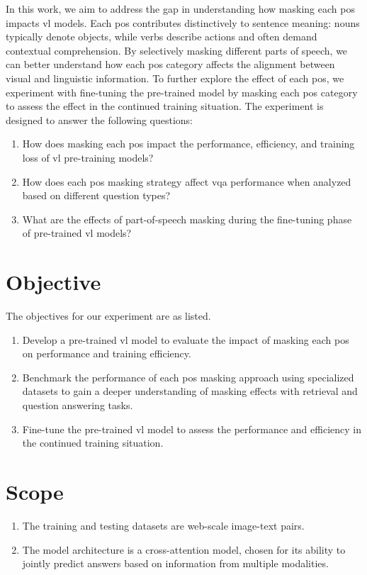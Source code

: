 In this work, we aim to address the gap in understanding how masking each \acrfull{pos} impacts \acrshort{vl} models.  
Each \acrshort{pos} contributes distinctively to sentence meaning: nouns typically denote objects, while verbs describe actions and often demand contextual comprehension.  
By selectively masking different parts of speech, we can better understand how each \acrshort{pos} category affects the alignment between visual and linguistic information.  
To further explore the effect of each \acrshort{pos}, we experiment with fine-tuning the pre-trained model by masking each \acrshort{pos} category to assess the effect in the continued training situation.  
The experiment is designed to answer the following questions:  
\begin{enumerate}  
    \item How does masking each \acrshort{pos} impact the performance, efficiency, and training loss of \acrshort{vl} pre-training models?  
    \item How does each \acrshort{pos} masking strategy affect \acrfull{vqa} performance when analyzed based on different question types?  
    \item What are the effects of part-of-speech masking during the fine-tuning phase of pre-trained \acrshort{vl} models?  
\end{enumerate}  


\section{Objective}  
The objectives for our experiment are as listed.  
\begin{enumerate}  
    \item Develop a pre-trained \acrshort{vl} model to evaluate the impact of masking each \acrshort{pos} on performance and training efficiency.  
    \item Benchmark the performance of each \acrshort{pos} masking approach using specialized datasets to gain a deeper understanding of masking effects with retrieval and question answering tasks.  
    \item Fine-tune the pre-trained \acrshort{vl} model to assess the performance and efficiency in the continued training situation.  
\end{enumerate}  

\section{Scope}
\begin{enumerate}  
    \item The training and testing datasets are web-scale image-text pairs.  
    \item The model architecture is a cross-attention model, chosen for its ability to jointly predict answers based on information from multiple modalities.  
\end{enumerate}  
